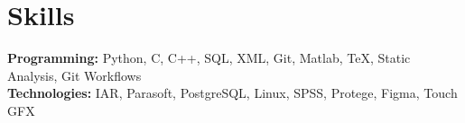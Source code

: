 \documentclass{../templates/simplecv}
\begin{document}
\section{Skills}
\vspace{3pt}
\resumeSubHeadingListStart
\small{\item{
    \textbf{Programming: }{Python, C, C++, SQL, XML, Git, Matlab, TeX, Static Analysis, Git Workflows} \\ \vspace{3pt}
    \textbf{Technologies: }{IAR, Parasoft, PostgreSQL, Linux, SPSS, Protege, Figma, Touch GFX}
}}
\resumeSubHeadingListEnd
\end{document}
